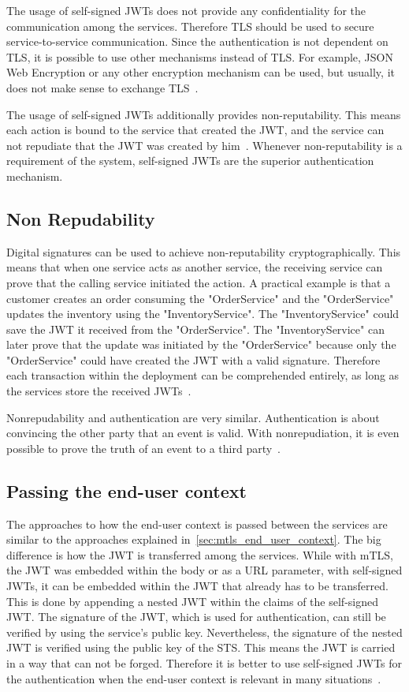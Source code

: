 The usage of self-signed JWTs does not provide any confidentiality for the communication among the services.
Therefore TLS should be used to secure service-to-service communication.
Since the authentication is not dependent on TLS, it is possible to use other mechanisms instead of TLS.
For example, JSON Web Encryption or any other encryption mechanism can be used, but usually, it does not make sense to exchange TLS~\cite{dias2020microservices}.

The usage of self-signed JWTs additionally provides non-reputability.
This means each action is bound to the service that created the JWT, and the service can not repudiate that the JWT was created by him~\cite{dias2020microservices}.
Whenever non-reputability is a requirement of the system, self-signed JWTs are the superior authentication mechanism.

\subsection{Non Repudability}
Digital signatures can be used to achieve non-reputability cryptographically.
This means that when one service acts as another service, the receiving service can prove that the calling service initiated the action.
A practical example is that a customer creates an order consuming the "OrderService" and the "OrderService" updates the inventory using the "InventoryService".
The "InventoryService" could save the JWT it received from the "OrderService".
The "InventoryService" can later prove that the update was initiated by the "OrderService" because only the "OrderService" could have created the JWT with a valid signature.
Therefore each transaction within the deployment can be comprehended entirely, as long as the services store the received JWTs~\cite{dias2020microservices}.

Nonrepudability and authentication are very similar.
Authentication is about convincing the other party that an event is valid.
With nonrepudiation, it is even possible to prove the truth of an event to a third party~\cite{wu20131200}.

\subsection{Passing the end-user context}
The approaches to how the end-user context is passed between the services are similar to the approaches explained in~\ref{sec:mtls_end_user_context}.
The big difference is how the JWT is transferred among the services.
While with mTLS, the JWT was embedded within the body or as a URL parameter, with self-signed JWTs, it can be embedded within the JWT that already has to be transferred.
This is done by appending a nested JWT within the claims of the self-signed JWT.
The signature of the JWT, which is used for authentication, can still be verified by using the service's public key.
Nevertheless, the signature of the nested JWT is verified using the public key of the STS.
This means the JWT is carried in a way that can not be forged.
Therefore it is better to use self-signed JWTs for the authentication when the end-user context is relevant in many situations~\cite{dias2020microservices}.

